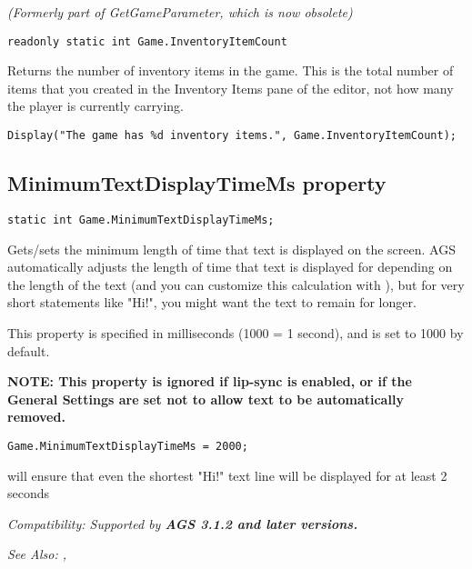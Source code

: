 \it{(Formerly part of GetGameParameter, which is now obsolete)}

\begin{verbatim}
readonly static int Game.InventoryItemCount
\end{verbatim}
Returns the number of inventory items in the game. This is the total number of items that you
created in the Inventory Items pane of the editor, not how many the player is currently carrying.

\begin{verbatim}
Display("The game has %d inventory items.", Game.InventoryItemCount);
\end{verbatim}


\subsection{MinimumTextDisplayTimeMs property}\label{Game.MinimumTextDisplayTimeMs}%

\begin{verbatim}
static int Game.MinimumTextDisplayTimeMs;
\end{verbatim}
Gets/sets the minimum length of time that text is displayed on the screen. AGS automatically
adjusts the length of time that text is displayed for depending on the length of the text
(and you can customize this calculation with ),
but for very short statements like "Hi!", you might want the text to remain for longer.

This property is specified in milliseconds (1000 = 1 second), and is set to 1000 by default.

\bf{NOTE:} This property is ignored if lip-sync is enabled, or if the General Settings
are set not to allow text to be automatically removed.

\begin{verbatim}
Game.MinimumTextDisplayTimeMs = 2000;
\end{verbatim}
will ensure that even the shortest "Hi!" text line will be displayed for at least 2 seconds

\it{Compatibility:} Supported by \bf{AGS 3.1.2} and later versions.

\it{See Also:} ,


